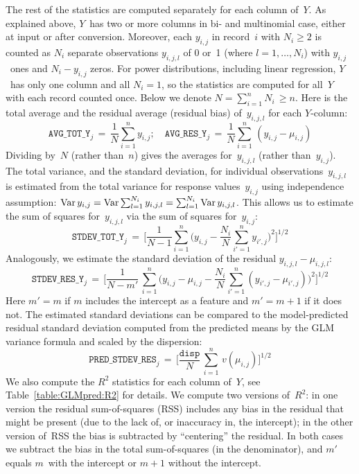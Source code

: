   The rest of the statistics are computed separately
for each column of~$Y$.  As explained above, $Y$~has two or more columns in bi- and multinomial case,
either at input or after conversion.  Moreover, each $y_{i,j}$ in record~$i$ with $N_i \geq 2$ is
counted as $N_i$ separate observations $y_{i,j,l}$ of 0 or~1 (where $l=1,\ldots,N_i$) with
$y_{i,j}$~ones and $N_i-y_{i,j}$ zeros.
For power distributions, including linear regression, $Y$~has only one column and all
$N_i = 1$, so the statistics are computed for all~$Y$ with each record counted once.
Below we denote $N = \sum_{i=1}^n N_i \,\geq n$.
Here is the total average and the residual average (residual bias) of~$y_{i,j,l}$ for each $Y$-column:
\begin{equation*}
\texttt{AVG\_TOT\_Y}_j   \,=\, \frac{1}{N} \sum_{i=1}^n  y_{i,j}; \quad
\texttt{AVG\_RES\_Y}_j   \,=\, \frac{1}{N} \sum_{i=1}^n \, (y_{i,j} - \mu_{i,j})
\end{equation*}
Dividing by~$N$ (rather than~$n$) gives the averages for~$y_{i,j,l}$ (rather than~$y_{i,j}$).
The total variance, and the standard deviation, for individual observations~$y_{i,j,l}$ is
estimated from the total variance for response values~$y_{i,j}$ using independence assumption:
$\mathop{\mathrm{Var}}\nolimits y_{i,j} = \mathop{\mathrm{Var}}\nolimits \sum_{l=1}^{N_i} y_{i,j,l} = \sum_{l=1}^{N_i} \mathop{\mathrm{Var}}\nolimits y_{i,j,l}$.
This allows us to estimate the sum of squares for~$y_{i,j,l}$ via the sum of squares for~$y_{i,j}$:
\begin{equation*}
\texttt{STDEV\_TOT\_Y}_j \,=\, 
\Bigg[\frac{1}{N-1} \sum_{i=1}^n  \Big( y_{i,j} -  \frac{N_i}{N} \sum_{i'=1}^n  y_{i'\!,j}\Big)^2\Bigg]^{1/2}
\end{equation*}
Analogously, we estimate the standard deviation of the residual $y_{i,j,l} - \mu_{i,j,l}$:
\begin{equation*}
\texttt{STDEV\_RES\_Y}_j \,=\, 
\Bigg[\frac{1}{N-m'} \,\sum_{i=1}^n  \Big( y_{i,j} - \mu_{i,j} -  \frac{N_i}{N} \sum_{i'=1}^n  (y_{i'\!,j} - \mu_{i'\!,j})\Big)^2\Bigg]^{1/2}
\end{equation*}
Here $m'=m$ if $m$ includes the intercept as a feature and $m'=m+1$ if it does not.
The estimated standard deviations can be compared to the model-predicted residual standard deviation
computed from the predicted means by the GLM variance formula and scaled by the dispersion:
\begin{equation*}
\texttt{PRED\_STDEV\_RES}_j \,=\, \Big[\frac{\texttt{disp}}{N} \, \sum_{i=1}^n \, v(\mu_{i,j})\Big]^{1/2}
\end{equation*}
We also compute the $R^2$ statistics for each column of~$Y$, see Table~\ref{table:GLMpred:R2} for details.
We compute two versions of~$R^2$: in one version the residual sum-of-squares (RSS) includes any bias in
the residual that might be present (due to the lack of, or inaccuracy in, the intercept); in the other
version of~RSS the bias is subtracted by ``centering'' the residual.  In both cases we subtract the bias in the total
sum-of-squares (in the denominator), and $m'$ equals $m$~with the intercept or $m+1$ without the intercept.

